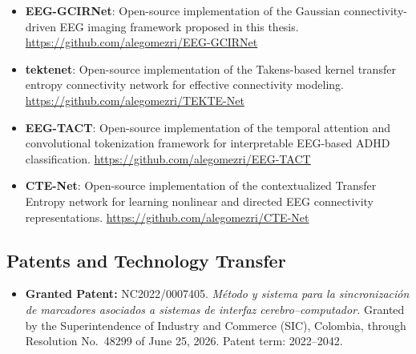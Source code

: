 \begin{itemize}
    \item \textbf{EEG-GCIRNet}: Open-source implementation of the Gaussian connectivity-driven EEG imaging framework proposed in this thesis.  
    \url{https://github.com/alegomezri/EEG-GCIRNet}
    
    \item \textbf{\gls{tektenet}}: Open-source implementation of the Takens-based kernel transfer entropy connectivity network for effective connectivity modeling.  
    \url{https://github.com/alegomezri/TEKTE-Net}
    
    \item \textbf{EEG-TACT}: Open-source implementation of the temporal attention and convolutional tokenization framework for interpretable EEG-based ADHD classification.
    \url{https://github.com/alegomezri/EEG-TACT}

    \item \textbf{CTE-Net}: Open-source implementation of the contextualized Transfer Entropy network for learning nonlinear and directed EEG connectivity representations.
    \url{https://github.com/alegomezri/CTE-Net}

\end{itemize}

\subsection{Patents and Technology Transfer}

\begin{itemize}
    \item \textbf{Granted Patent:} NC2022/0007405.
    \emph{Método y sistema para la sincronización de marcadores asociados a sistemas de interfaz cerebro--computador.}
    Granted by the Superintendence of Industry and Commerce (SIC), Colombia,
    through Resolution No.~48299 of June 25, 2026. Patent term: 2022--2042.
\end{itemize}
